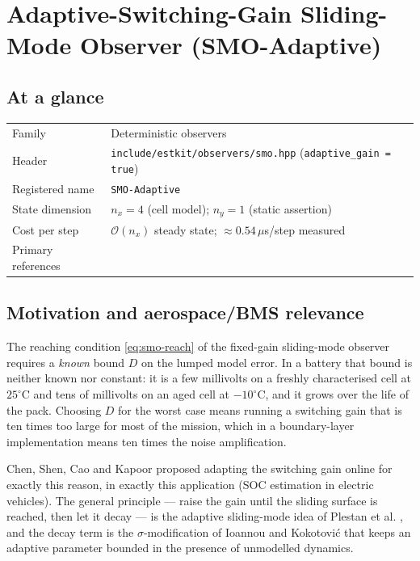 \chapter{Adaptive-Switching-Gain Sliding-Mode Observer (SMO-Adaptive)}
\label{ch:smoadaptive}

\section*{At a glance}
\begin{tabular}{@{}l>{\raggedright\arraybackslash}p{}@{}}
Family & Deterministic observers \\
Header & \texttt{include/estkit/observers/smo.hpp} (\texttt{adaptive\_gain = true}) \\
Registered name & \texttt{SMO-Adaptive} \\
State dimension & $n_x = 4$ (cell model); $n_y = 1$ (static assertion) \\
Cost per step & $\mathcal{O}(n_x)$ steady state; $\approx 0.54\,\mu$s/step measured \\
Primary references & \cite{chen2014adaptivesmo,plestan2010adaptive,ioannou1984sigma,utkin1992,kim2008smo} \\
\end{tabular}

\section{Motivation and aerospace/BMS relevance}
The reaching condition \eqref{eq:smo-reach} of the fixed-gain sliding-mode observer requires a
\emph{known} bound $D$ on the lumped model error.  In a battery that bound is neither known nor
constant: it is a few millivolts on a freshly characterised cell at $25^\circ$C and tens of
millivolts on an aged cell at $-10^\circ$C, and it grows over the life of the pack.  Choosing $D$
for the worst case means running a switching gain that is ten times too large for most of the
mission, which in a boundary-layer implementation means ten times the noise amplification.

Chen, Shen, Cao and Kapoor \cite{chen2014adaptivesmo} proposed adapting the switching gain online
for exactly this reason, in exactly this application (SOC estimation in electric vehicles).  The
general principle --- raise the gain until the sliding surface is reached, then let it decay ---
is the adaptive sliding-mode idea of Plestan et al. \cite{plestan2010adaptive}, and the decay
term is the $\sigma$-modification of Ioannou and Kokotovi\'c \cite{ioannou1984sigma} that keeps
an adaptive parameter bounded in the presence of unmodelled dynamics.

